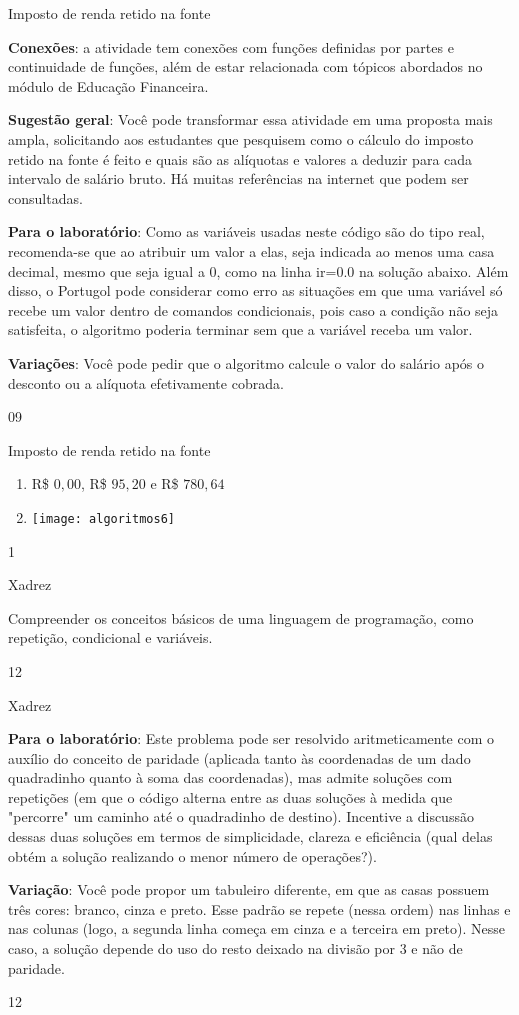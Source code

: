 \marginpar{\vspace{-1em}}
\begin{sugestions}{Imposto de renda retido na fonte}
{
\textbf{Conexões}: a atividade tem conexões com funções definidas por partes e continuidade de funções, além de estar relacionada com tópicos abordados no módulo de Educação Financeira.

\textbf{Sugestão geral}: Você pode transformar essa atividade em uma proposta mais ampla, solicitando aos estudantes que pesquisem como o cálculo do imposto retido na fonte é feito e quais são as alíquotas e valores a deduzir para cada intervalo de salário bruto. Há muitas referências na internet que podem ser consultadas.

\textbf{Para o laboratório}: Como as variáveis usadas neste código são do tipo real, recomenda-se que ao atribuir um valor a elas, seja indicada ao menos uma casa decimal, mesmo que seja igual a 0, como na linha ir=0.0 na solução abaixo. Além disso, o Portugol pode considerar como erro as situações em que uma variável só recebe um valor dentro de comandos condicionais, pois caso a condição não seja satisfeita, o algoritmo poderia terminar sem que a variável receba um valor.

\textbf{Variações}: Você pode pedir que o algoritmo calcule o valor do salário após o desconto ou a alíquota efetivamente cobrada.
}{0}{9}
\end{sugestions}
\begin{answer}{Imposto de renda retido na fonte}
{
\begin{enumerate}
\item R\$ $0{,}00$, R\$ $95{,}20$ e R\$ $780{,}64$
\item {}
{
\texttt{[image: algoritmos6]}
}
\end{enumerate}
}{1}
\end{answer}
\begin{objectives}{Xadrez}
{
Compreender os conceitos básicos de uma linguagem de programação, como repetição, condicional e variáveis.


}{1}{2}
\end{objectives}
\begin{sugestions}{Xadrez}
{
\textbf{Para o laboratório}: Este problema pode ser resolvido aritmeticamente com o auxílio do conceito de paridade (aplicada tanto às coordenadas de um dado quadradinho quanto à soma das coordenadas), mas admite soluções com repetições (em que o código alterna entre as duas soluções à medida que "percorre"{} um caminho até o quadradinho de destino). Incentive a discussão dessas duas soluções em termos de simplicidade, clareza e eficiência (qual delas obtém a solução realizando o menor número de operações?).

\textbf{Variação}: Você pode propor um tabuleiro diferente, em que as casas possuem três cores: branco, cinza e preto. Esse padrão se repete (nessa ordem) nas linhas e nas colunas (logo, a segunda linha começa em cinza e a terceira em preto). Nesse caso, a solução depende do uso do resto deixado na divisão por 3 e não de paridade.
}{1}{2}
\end{sugestions}
